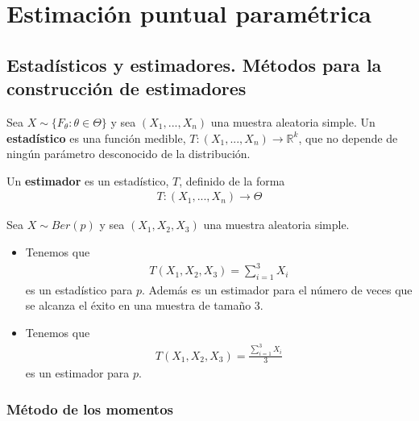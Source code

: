 \chapter{Estimación puntual paramétrica}

\section{Estadísticos y estimadores. Métodos para la construcción de estimadores}

\begin{defi}
    Sea $X \sim \{ F_{\theta} : \theta \in \Theta  \}$ y sea $(X_1,...,X_n)$ una muestra aleatoria simple. Un \textbf{estadístico} es una función medible, $T : (X_1,...,X_n) \longrightarrow \mathbb{R}^k$, que no depende de ningún parámetro desconocido de la distribución.
\end{defi}

\begin{defi}
    Un \textbf{estimador} es un estadístico, $T$, definido de la forma
    \begin{align*}
        T: (X_1,...,X_n) \longrightarrow \Theta
    \end{align*}
\end{defi}

\begin{ejemplo}
    Sea $X \sim Ber(p)$ y sea $(X_1,X_2,X_3)$ una muestra aleatoria simple.
    \begin{itemize}
        \item Tenemos que
              \begin{align*}
                  T(X_1,X_2,X_3) = \sum_{i=1}^{3}{X_i}
              \end{align*}
              es un estadístico para $p$. Además es un estimador para el número de veces que se alcanza el éxito en una muestra de tamaño 3.
        \item Tenemos que
              \begin{align*}
                  T(X_1,X_2,X_3) = \frac{\sum_{i=1}^{3}{X_i}}{3}
              \end{align*}
              es un estimador para $p$.
    \end{itemize}
\end{ejemplo}

\subsection{Método de los momentos}

